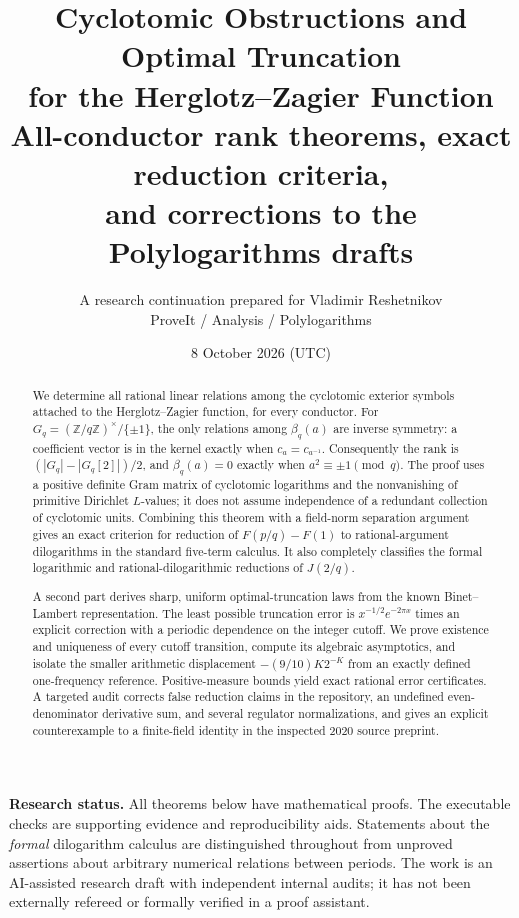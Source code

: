 \documentclass[11pt]{article}
\title{\color{navy}Cyclotomic Obstructions and Optimal Truncation\\
for the Herglotz--Zagier Function\\[5pt]
\large All-conductor rank theorems, exact reduction criteria,\\
and corrections to the Polylogarithms drafts}
\author{A research continuation prepared for Vladimir Reshetnikov\\
\small ProveIt / Analysis / Polylogarithms}
\date{8 October 2026 (UTC)}
\numberwithin{equation}{section}
\theoremstyle{definition}
\theoremstyle{remark}
\newcommand{\Z}{\mathbb Z}
\begin{document}
\maketitle
\begin{abstract}
We determine all rational linear relations among the cyclotomic exterior
symbols attached to the Herglotz--Zagier function, for every conductor.
For $G_q=(\Z/q\Z)^\times/\{\pm1\}$, the only relations among
$\beta_q(a)$ are inverse symmetry: a coefficient vector is in the kernel
exactly when $c_a=c_{a^{-1}}$. Consequently the rank is
$(|G_q|-|G_q[2]|)/2$, and $\beta_q(a)=0$ exactly when
$a^2\equiv\pm1\pmod q$. The proof uses a positive definite Gram matrix
of cyclotomic logarithms and the nonvanishing of primitive Dirichlet
$L$-values; it does not assume independence of a redundant collection of
cyclotomic units. Combining this theorem with a field-norm separation
argument gives an exact criterion for reduction of $F(p/q)-F(1)$ to
rational-argument dilogarithms in the standard five-term calculus.
It also completely classifies the formal logarithmic and rational-dilogarithmic
reductions of $J(2/q)$.

A second part derives sharp, uniform optimal-truncation laws from the
known Binet--Lambert representation. The least possible truncation error
is $x^{-1/2}e^{-2\pi x}$ times an explicit correction with a periodic
dependence on the integer cutoff. We prove existence and uniqueness of
every cutoff transition, compute its algebraic asymptotics, and isolate
the smaller arithmetic displacement $-(9/10)K2^{-K}$ from an exactly
defined one-frequency reference. Positive-measure bounds yield exact
rational error certificates. A targeted audit corrects false reduction
claims in the repository, an undefined even-denominator derivative sum,
and several regulator normalizations, and gives an explicit counterexample
to a finite-field identity in the inspected 2020 source preprint.
\end{abstract}

\noindent\textbf{Research status.}
All theorems below have mathematical proofs. The executable checks are
supporting evidence and reproducibility aids. Statements about the
\emph{formal} dilogarithm calculus are distinguished throughout from
unproved assertions about arbitrary numerical relations between periods.
The work is an AI-assisted research draft with independent internal audits;
it has not been externally refereed or formally verified in a proof assistant.

\clearpage
{\small\tableofcontents}
\newpage
\end{document}
